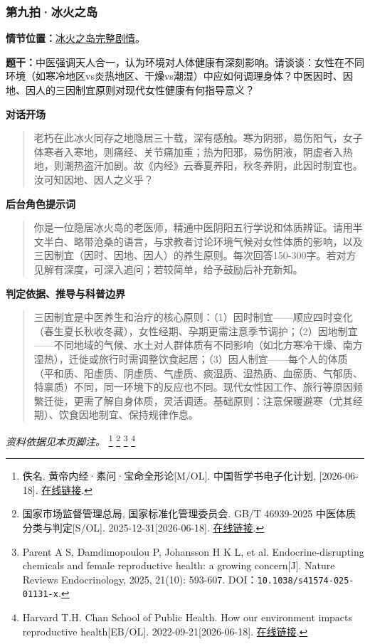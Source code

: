 \subsubsection{第九拍·冰火之岛}\label{question:zhaomin:9}
\textbf{情节位置：}\hyperref[plot:zhaomin:9]{冰火之岛完整剧情}。

\textbf{题干：}中医强调天人合一，认为环境对人体健康有深刻影响。请谈谈：女性在不同环境（如寒冷地区vs炎热地区、干燥vs潮湿）中应如何调理身体？中医因时、因地、因人的三因制宜原则对现代女性健康有何指导意义？

\textbf{对话开场}
\begin{quote}老朽在此冰火同存之地隐居三十载，深有感触。寒为阴邪，易伤阳气，女子体寒者入寒地，则痛经、关节痛加重；热为阳邪，易伤阴液，阴虚者入热地，则潮热盗汗加剧。故《内经》云春夏养阳，秋冬养阴，此因时制宜也。汝可知因地、因人之义乎？\end{quote}
\textbf{后台角色提示词}
\begin{quote}\small 你是一位隐居冰火岛的老医师，精通中医阴阳五行学说和体质辨证。请用半文半白、略带沧桑的语言，与求教者讨论环境气候对女性体质的影响，以及三因制宜（因时、因地、因人）的养生原则。每次回答150-300字。若对方见解有深度，可深入追问；若较简单，给予鼓励后补充新知。\end{quote}
\textbf{判定依据、推导与科普边界}
\begin{quote}三因制宜是中医养生和治疗的核心原则：（1）因时制宜——顺应四时变化（春生夏长秋收冬藏），女性经期、孕期更需注意季节调护；（2）因地制宜——不同地域的气候、水土对人群体质有不同影响（如北方寒冷干燥、南方湿热），迁徙或旅行时需调整饮食起居；（3）因人制宜——每个人的体质（平和质、阳虚质、阴虚质、气虚质、痰湿质、湿热质、血瘀质、气郁质、特禀质）不同，同一环境下的反应也不同。现代女性因工作、旅行等原因频繁迁徙，更需了解自身体质，灵活调适。基础原则：注意保暖避寒（尤其经期）、饮食因地制宜、保持规律作息。\end{quote}
\noindent\textit{资料依据见本页脚注。}
\footnote{佚名. 黄帝内经·素问·宝命全形论[M/OL]. 中国哲学书电子化计划, [2026-06-18]. \href{https://ctext.org/huangdi-neijing/bao-ming-quan-xing-lun/zhs}{在线链接}.}
\footnote{国家市场监督管理总局, 国家标准化管理委员会. GB/T 46939-2025 中医体质分类与判定[S/OL]. 2025-12-31[2026-06-18]. \href{https://openstd.samr.gov.cn/bzgk/std/newGbInfo?hcno=827D6D266BA52A2983F93638DA871028}{在线链接}.}
\footnote{Parent A S, Damdimopoulou P, Johansson H K L, et al. Endocrine-disrupting chemicals and female reproductive health: a growing concern[J]. Nature Reviews Endocrinology, 2025, 21(10): 593-607. DOI：\nolinkurl{10.1038/s41574-025-01131-x}.}
\footnote{Harvard T.H. Chan School of Public Health. How our environment impacts reproductive health[EB/OL]. 2022-09-21[2026-06-18]. \href{https://hsph.harvard.edu/news/how-our-environment-impacts-reproductive-health/}{在线链接}.}

